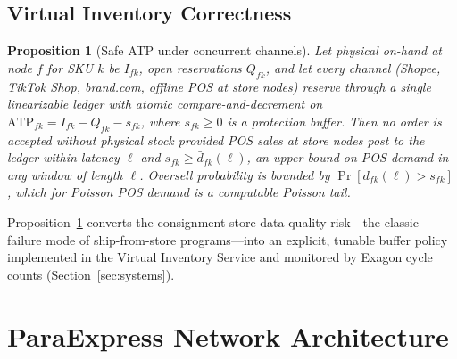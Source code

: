 \documentclass[journal]{IEEEtran}
\newtheorem{proposition}{Proposition}
\begin{document}
\subsection{Virtual Inventory Correctness}

\begin{proposition}[Safe ATP under concurrent channels]
\label{prop:atp}
Let physical on-hand at node $f$ for SKU $k$ be $I_{fk}$, open reservations $Q_{fk}$, and let every channel (Shopee, TikTok Shop, brand.com, offline POS at store nodes) reserve through a single linearizable ledger with atomic compare-and-decrement on $\mathrm{ATP}_{fk} = I_{fk} - Q_{fk} - s_{fk}$, where $s_{fk} \ge 0$ is a protection buffer. Then no order is accepted without physical stock provided POS sales at store nodes post to the ledger within latency $\ell$ and $s_{fk} \ge \bar{d}_{fk}(\ell)$, an upper bound on POS demand in any window of length $\ell$. Oversell probability is bounded by $\Pr[d_{fk}(\ell) > s_{fk}]$, which for Poisson POS demand is a computable Poisson tail.
\end{proposition}

Proposition~\ref{prop:atp} converts the consignment-store data-quality risk---the classic failure mode of ship-from-store programs---into an explicit, tunable buffer policy implemented in the Virtual Inventory Service and monitored by Exagon cycle counts (Section~\ref{sec:systems}).

\section{ParaExpress Network Architecture}
\label{sec:network}
\end{document}

